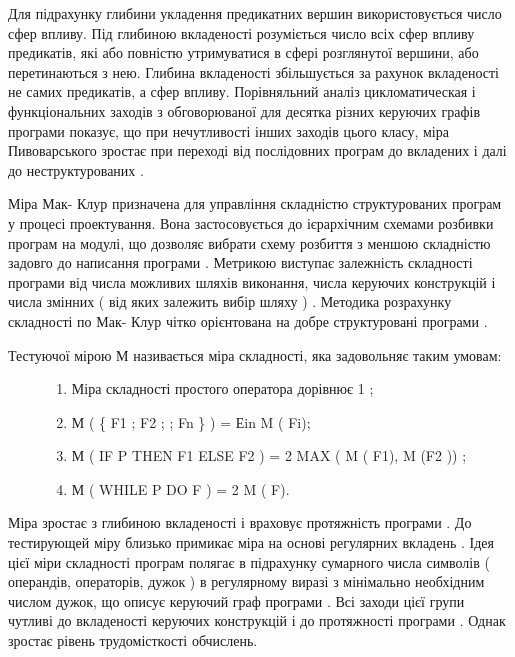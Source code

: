 Для підрахунку глибини укладення предикатних вершин використовується число сфер впливу. Під глибиною вкладеності розуміється число всіх сфер впливу предикатів, які або повністю утримуватися в сфері розглянутої вершини, або перетинаються з нею. Глибина вкладеності збільшується за рахунок вкладеності не самих предикатів, а сфер впливу. Порівняльний аналіз цикломатическая і функціональних заходів з обговорюваної для десятка різних керуючих графів програми показує, що при нечутливості інших заходів цього класу, міра Пивоварського зростає при переході від послідовних програм до вкладених і далі до неструктурованих .

Міра Мак- Клур призначена для управління складністю структурованих програм у процесі проектування. Вона застосовується до ієрархічним схемами розбивки програм на модулі, що дозволяє вибрати схему розбиття з меншою складністю задовго до написання програми . Метрикою виступає залежність складності програми від числа можливих шляхів виконання, числа керуючих конструкцій і числа змінних ( від яких залежить вибір шляху ) . Методика розрахунку складності по Мак- Клур чітко орієнтована на добре структуровані програми .
\begin{description}
\item[{Тестуючої мірою М називається міра складності, яка задовольняє таким умовам:}] \leavevmode\begin{enumerate}
\item {} 
Міра складності простого оператора дорівнює 1 ;

\item {} 
М ( \{ F1 ; F2 ;  ; Fn \} ) = Еin M ( Fi);

\item {} 
М ( IF P THEN F1 ELSE F2 ) = 2 MAX ( M ( F1), M (F2 )) ;

\item {} 
М ( WHILE P DO F ) = 2 M ( F).

\end{enumerate}

\end{description}

Міра зростає з глибиною вкладеності і враховує протяжність програми . До тестирующей міру близько примикає міра на основі регулярних вкладень . Ідея цієї міри складності програм полягає в підрахунку сумарного числа символів ( операндів, операторів, дужок ) в регулярному виразі з мінімально необхідним числом дужок, що описує керуючий граф програми . Всі заходи цієї групи чутливі до вкладеності керуючих конструкцій і до протяжності програми . Однак зростає рівень трудомісткості обчислень.

